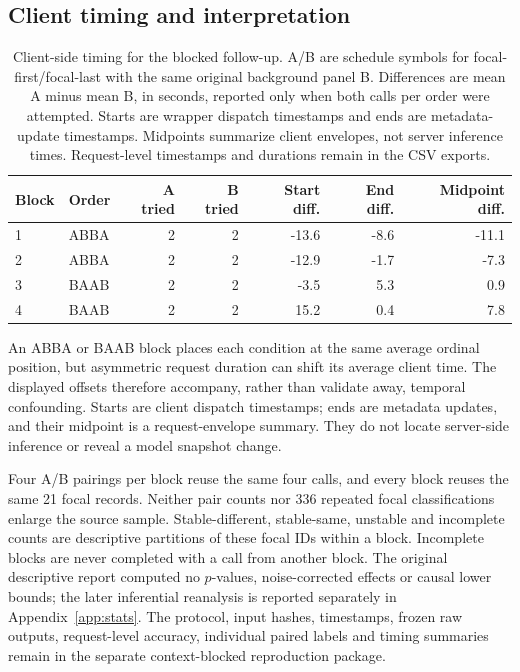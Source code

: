 \documentclass[11pt,a4paper]{article}
\begin{document}
\subsection{Client timing and interpretation}
\begin{table}[htbp]\centering\small
\caption{Client-side timing for the blocked follow-up. A/B are schedule symbols for focal-first/focal-last with the same original background panel B. Differences are mean A minus mean B, in seconds, reported only when both calls per order were attempted. Starts are wrapper dispatch timestamps and ends are metadata-update timestamps. Midpoints summarize client envelopes, not server inference times. Request-level timestamps and durations remain in the CSV exports.}
\label{tab:context_blocked_timing}
\begin{tabular}{@{}llrrrrr@{}}\toprule
Block & Order & A tried & B tried & Start diff. & End diff. & Midpoint diff. \\\midrule
1 & ABBA & 2 & 2 & -13.6 & -8.6 & -11.1 \\
2 & ABBA & 2 & 2 & -12.9 & -1.7 & -7.3 \\
3 & BAAB & 2 & 2 & -3.5 & 5.3 & 0.9 \\
4 & BAAB & 2 & 2 & 15.2 & 0.4 & 7.8 \\
\bottomrule\end{tabular}\end{table}

An ABBA or BAAB block places each condition at the same average ordinal position, but asymmetric request duration can shift its average client time. The displayed offsets therefore accompany, rather than validate away, temporal confounding. Starts are client dispatch timestamps; ends are metadata updates, and their midpoint is a request-envelope summary. They do not locate server-side inference or reveal a model snapshot change.

Four A/B pairings per block reuse the same four calls, and every block reuses the same 21 focal records. Neither pair counts nor 336 repeated focal classifications enlarge the source sample. Stable-different, stable-same, unstable and incomplete counts are descriptive partitions of these focal IDs within a block. Incomplete blocks are never completed with a call from another block. The original descriptive report computed no $p$-values, noise-corrected effects or causal lower bounds; the later inferential reanalysis is reported separately in Appendix~\ref{app:stats}. The protocol, input hashes, timestamps, frozen raw outputs, request-level accuracy, individual paired labels and timing summaries remain in the separate context-blocked reproduction package.
\end{document}
